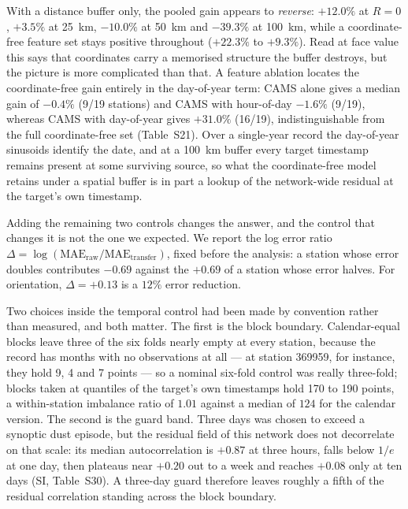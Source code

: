 \documentclass[review,times,authoryear]{elsarticle}
\begin{document}
With a distance buffer only, the pooled gain appears to \emph{reverse}: $+12.0\%$ at $R=0$, $+3.5\%$ at 25~km, $-10.0\%$ at 50~km and $-39.3\%$ at 100~km, while a coordinate-free feature set stays positive throughout ($+22.3\%$ to $+9.3\%$). Read at face value this says that coordinates carry a memorised structure the buffer destroys, but the picture is more complicated than that. A feature ablation locates the coordinate-free gain entirely in the day-of-year term: CAMS alone gives a median gain of $-0.4\%$ (9/19 stations) and CAMS with hour-of-day $-1.6\%$ (9/19), whereas CAMS with day-of-year gives $+31.0\%$ (16/19), indistinguishable from the full coordinate-free set (Table~S21). Over a single-year record the day-of-year sinusoids identify the date, and at a 100~km buffer every target timestamp remains present at some surviving source, so what the coordinate-free model retains under a spatial buffer is in part a lookup of the network-wide residual at the target's own timestamp.

Adding the remaining two controls changes the answer, and the control that changes it is not the one we expected. We report the log error ratio $\Delta=\log(\mathrm{MAE_{raw}}/\mathrm{MAE_{transfer}})$, fixed before the analysis: a station whose error doubles contributes $-0.69$ against the $+0.69$ of a station whose error halves. For orientation, $\Delta=+0.13$ is a $12\%$ error reduction.

Two choices inside the temporal control had been made by convention rather than measured, and both matter. The first is the block boundary. Calendar-equal blocks leave three of the six folds nearly empty at every station, because the record has months with no observations at all --- at station 369959, for instance, they hold 9, 4 and 7 points --- so a nominal six-fold control was really three-fold; blocks taken at quantiles of the target's own timestamps hold 170 to 190 points, a within-station imbalance ratio of $1.01$ against a median of $124$ for the calendar version. The second is the guard band. Three days was chosen to exceed a synoptic dust episode, but the residual field of this network does not decorrelate on that scale: its median autocorrelation is $+0.87$ at three hours, falls below $1/e$ at one day, then plateaus near $+0.20$ out to a week and reaches $+0.08$ only at ten days (SI, Table~S30). A three-day guard therefore leaves roughly a fifth of the residual correlation standing across the block boundary.
\end{document}
